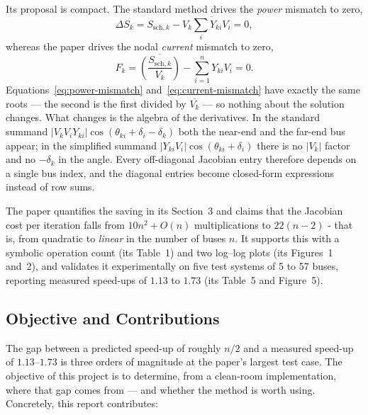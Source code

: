 \documentclass[sigconf,nonacm]{acmart}
\begin{document}
Its proposal is compact. The standard method drives the \emph{power} mismatch
to zero,
\begin{equation}
\Delta S_k = S_{\mathrm{sch},k} - V_k \overline{\textstyle\sum_i Y_{ki} V_i} = 0 ,
\label{eq:power-mismatch}
\end{equation}
whereas the paper drives the nodal \emph{current} mismatch to zero,
\begin{equation}
F_k = \overline{\left(\frac{S_{\mathrm{sch},k}}{V_k}\right)}
      - \sum_{i=1}^{n} Y_{ki} V_i = 0 .
\label{eq:current-mismatch}
\end{equation}
Equations~\eqref{eq:power-mismatch} and~\eqref{eq:current-mismatch} have exactly
the same roots --- the second is the first divided by $\overline{V_k}$ --- so
nothing about the solution changes. What changes is the algebra of the
derivatives. In the standard summand
$|V_k V_i Y_{ki}|\cos(\theta_{ki} + \delta_i - \delta_k)$ both the near-end and
the far-end bus appear; in the simplified summand
$|Y_{ki}V_i|\cos(\theta_{ki} + \delta_i)$ there is no $|V_k|$ factor and no
$-\delta_k$ in the angle. Every off-diagonal Jacobian entry therefore depends on
a single bus index, and the diagonal entries become closed-form expressions
instead of row sums.

The paper quantifies the saving in its Section~3 and claims that the Jacobian
cost per iteration falls from $10n^2 + O(n)$ multiplications to $22(n-2)$ -
that is, from quadratic to \emph{linear} in the number of buses $n$. It supports
this with a symbolic operation count (its Table~1) and two log--log plots (its
Figures~1 and~2), and validates it experimentally on five test systems of 5 to
57 buses, reporting measured speed-ups of $1.13$ to $1.73$ (its Table~5 and
Figure~5).

\subsection{Objective and Contributions}
The gap between a predicted speed-up of roughly $n/2$ and a measured speed-up of
$1.13$--$1.73$ is three orders of magnitude at the paper's largest test case. The
objective of this project is to determine, from a clean-room implementation,
where that gap comes from --- and whether the method is worth using. Concretely,
this report contributes:
\end{document}
